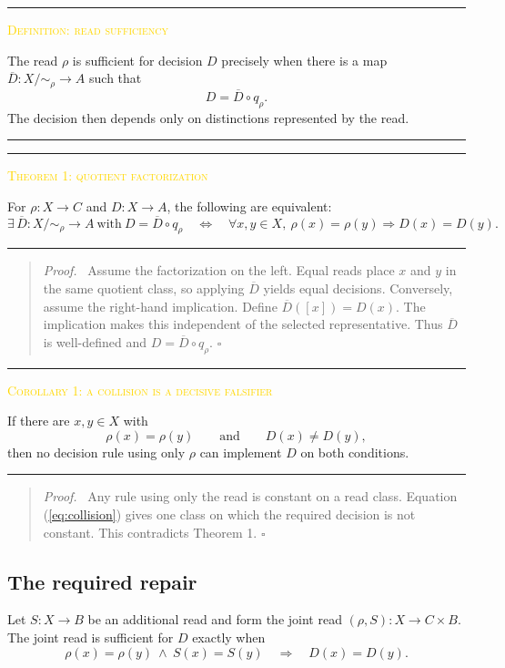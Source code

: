 \documentclass[11pt]{article}
\newcommand{\smallcaps}[1]{{\footnotesize\textsc{#1}}}
\newcommand{\eqrefn}[1]{(\ref{#1})}
\newenvironment{claimbox}[1]{%
  \par\vspace{0.55em}\noindent\begin{minipage}{\linewidth}
  \color{line}\rule{\linewidth}{0.55pt}\par\vspace{0.34em}%
  \textcolor{gold}{\smallcaps{#1}}\par\vspace{0.3em}\color{ink}%
}{%
  \par\vspace{0.38em}\color{line}\rule{\linewidth}{0.55pt}%
  \end{minipage}\par\vspace{0.55em}%
}
\newenvironment{proofbox}{%
  \begin{quote}\small\color{deep}\textit{Proof.}\ }{\hfill$\square$\end{quote}}
\begin{document}
\begin{claimbox}{Definition: read sufficiency}
The read $\rho$ is sufficient for decision $D$ precisely when there is a map $\overline D:X/{\sim_\rho}\to A$ such that
\[
D=\overline D\circ q_\rho.
\tag{6}\label{eq:factor}
\]
The decision then depends only on distinctions represented by the read.
\end{claimbox}

\begin{claimbox}{Theorem 1: quotient factorization}
For $\rho:X\to C$ and $D:X\to A$, the following are equivalent:
\[
\exists\,\overline D:X/{\sim_\rho}\to A\ \text{with}\ D=\overline D\circ q_\rho
\quad\Longleftrightarrow\quad
\forall x,y\in X,\ \rho(x)=\rho(y)\Rightarrow D(x)=D(y).
\tag{7}\label{eq:factorization}
\]
\end{claimbox}

\begin{proofbox}
Assume the factorization on the left. Equal reads place $x$ and $y$ in the same quotient class, so applying $\overline D$ yields equal decisions. Conversely, assume the right-hand implication. Define $\overline D([x])=D(x)$. The implication makes this independent of the selected representative. Thus $\overline D$ is well-defined and $D=\overline D\circ q_\rho$.
\end{proofbox}

\begin{claimbox}{Corollary 1: a collision is a decisive falsifier}
If there are $x,y\in X$ with
\[
\rho(x)=\rho(y)\qquad\text{and}\qquad D(x)\ne D(y),
\tag{8}\label{eq:collision}
\]
then no decision rule using only $\rho$ can implement $D$ on both conditions.
\end{claimbox}

\begin{proofbox}
Any rule using only the read is constant on a read class. Equation \eqrefn{eq:collision} gives one class on which the required decision is not constant. This contradicts Theorem 1.
\end{proofbox}

\subsection{The required repair}

Let $S:X\to B$ be an additional read and form the joint read $(\rho,S):X\to C\times B$. The joint read is sufficient for $D$ exactly when
\[
\rho(x)=\rho(y)\ \land\ S(x)=S(y)\quad\Longrightarrow\quad D(x)=D(y).
\tag{9}\label{eq:supplement}
\]
\end{document}
